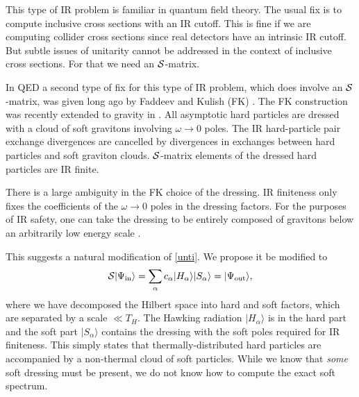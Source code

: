 \documentclass[12pt]{article}
\numberwithin{equation}{section}
\def\cs{{\cal S}}
\def\>{\rangle }
\newcommand{\be}{\begin{equation}}
\newcommand{\ee}{\end{equation}}
\begin{document}
 This type of IR problem is familiar in quantum field theory. The usual fix is to compute inclusive cross sections with an IR cutoff. This is fine if we are computing collider cross sections since real  detectors have an intrinsic IR cutoff. But subtle issues of unitarity cannot be addressed in the context of inclusive cross sections. For that we need an $\cs$-matrix. 

In QED a second type of  fix for this type of IR problem, which does  involve an $\cs$-matrix, was given long ago by 
Faddeev and Kulish (FK) \cite{Kulish:1970ut}. The FK construction was recently extended to gravity in \cite{Ware:2013zja}.  All asymptotic hard particles are 
dressed with a cloud of soft gravitons involving $\omega\to 0$ poles.  The IR hard-particle pair exchange divergences are cancelled by divergences in exchanges between hard particles and soft graviton clouds. $\cs$-matrix elements of the dressed hard particles are IR finite. 

There is a large ambiguity in the FK choice of the dressing. IR finiteness only fixes the coefficients of the $\omega\to 0$ poles in the dressing factors. For the purposes of IR safety, one can take the dressing to be entirely composed of gravitons below an arbitrarily low energy scale \lir. 


This suggests a natural modification of \eqref{unti}. We propose it be modified to  
\be\label{nti}  \cs |\Psi_{\rm in} \> = \sum_\alpha c_\alpha |H_\alpha\>|S_\alpha\>=|\Psi_{\rm out} \>  , \ee
where we have decomposed  the Hilbert space into hard and soft factors, which are separated by a scale \lir$\ll T_H$. The Hawking radiation $ |H_\alpha\>$ is in the hard part and the soft part $ |S_\alpha\>$ contains the dressing with the soft poles required for IR finiteness. 
This simply states that thermally-distributed hard particles are accompanied by a non-thermal 
cloud of soft particles. While we know that {\it some} soft dressing must be present, we do not know how to compute the exact soft spectrum. 
\end{document}
